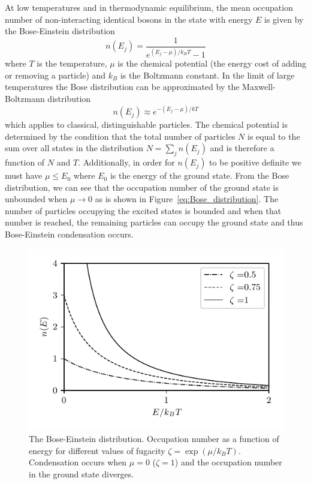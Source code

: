 At low temperatures and in thermodynamic equilibrium, the mean occupation number of non-interacting identical bosons in the state with energy $E$ is given by the Bose-Einstein distribution
%
\begin{equation}
	n(E_j)=\frac{1}{e^{(E_j-\mu)/k_BT}-1}
	\label{eq:Bose_distribution}	
\end{equation}
%
where $T$ is the temperature, $\mu$ is the chemical potential (the energy cost of adding or removing a particle) and $k_B$ is the Boltzmann constant. In the limit of large temperatures the Bose distribution can be approximated by the Maxwell-Boltzmann distribution
%
\begin{equation}
	n(E_j)\approx e^{-(E_j-\mu)/kT}
\end{equation}
%
which applies to classical, distinguishable particles. The chemical potential is determined by the condition that the total number of particles $N$ is equal to the sum over all states in the distribution $N=\sum_jn(E_j)$ and is therefore a function of $N$ and $T$. Additionally, in order for $n(E_j)$ to be positive definite we must have $\mu\leq E_0$ where $E_0$ is the energy of the ground state. From the Bose distribution, we can see that the occupation number of the ground state is unbounded when $\mu\rightarrow0$ as is shown in Figure~\ref{eq:Bose_distribution}. The number of particles occupying the excited states is bounded and when that number is reached, the remaining particles can occupy the ground state and thus Bose-Einstein condensation occurs. 

\begin{figure}[htb]
\begin{center}
\includegraphics[]{Figures/Chapter2/Bose_distribution.pdf}
\caption[The Bose-Einstein distribution]{The Bose-Einstein distribution. Occupation number as a function of energy for different values of fugacity $\zeta=\exp(\mu /k_BT)$. Condensation occurs when $\mu=0$ ($\zeta=1$) and the occupation number in the ground state diverges.}
\label{fig:Bose_distribution}
\end{center}
\end{figure}

